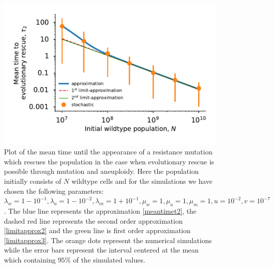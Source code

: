 \documentclass[12pt]{extarticle}
\begin{document}
\begin{figure}[p]
 \vspace*{1\baselineskip}
\includegraphics[width=1\textwidth]{Figures/MeanTimeDeleteriousPlot.pdf}
\caption{Plot of the mean time until the appearance of a resistance mutation which rescues the population in the case when evolutionary rescue is possible 
 through mutation and aneuploidy.  Here the population initially consists of $N$ wildtype cells and for the simulations we have chosen the following parameters: $\lambda_w=1-10^{-1},\lambda_a=1-10^{-2},\lambda_m=1+10^{-1},\mu_w=1,\mu_a=1,\mu_m=1,u=10^{-2},v=10^{-7}$.  The blue line represents the approximation \eqref{meantimet2}, the dashed red line represents the second order approximation \eqref{limitapprox2} and the green line is first order approximation \eqref{limitapprox3}. The orange dots represent the numerical simulations while the error bars represent the interval centered at the mean which containing $95\%$ of the simulated values.}
\label{MeanTimeDeleteriousAneuploidyPlot}
\end{figure}
\end{document}
